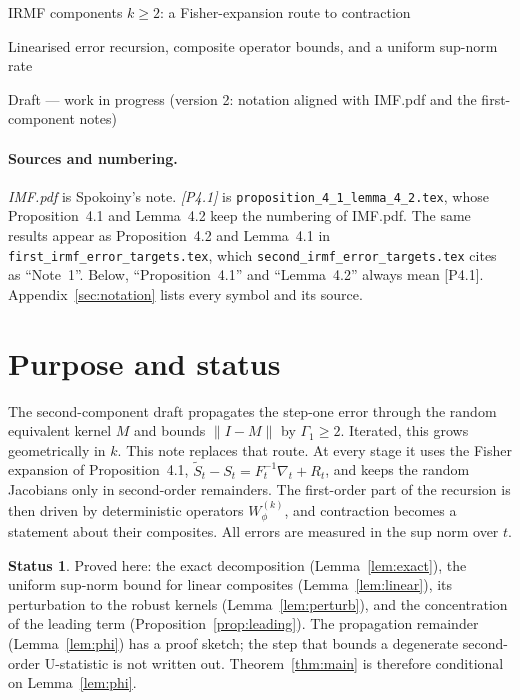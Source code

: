 \documentclass[11pt]{article}
\newcommand{\norm}[1]{\lVert#1\rVert}
\newcommand{\IMFt}{\widetilde S}
\theoremstyle{definition}
\newtheorem*{status}{Status}
\begin{document}
\sloppy
\begin{center}
  {\Large IRMF components \(k\ge2\): a Fisher-expansion route to contraction\par}
  \vspace{4pt}
  {\large Linearised error recursion, composite operator bounds, and a
   uniform sup-norm rate\par}
  \vspace{4pt}
  {\normalsize Draft --- work in progress (version 2: notation aligned with
  IMF.pdf and the first-component notes)}
\end{center}

\paragraph{Sources and numbering.}
\emph{IMF.pdf} is Spokoiny's note.  \emph{[P4.1]} is
\texttt{proposition\_4\_1\_lemma\_4\_2.tex}, whose Proposition~4.1 and
Lemma~4.2 keep the numbering of IMF.pdf.  The same results appear as
Proposition~4.2 and Lemma~4.1 in \texttt{first\_irmf\_error\_targets.tex},
which \texttt{second\_irmf\_error\_targets.tex} cites as ``Note~1''.  Below,
``Proposition~4.1'' and ``Lemma~4.2'' always mean [P4.1].
Appendix~\ref{sec:notation} lists every symbol and its source.

\section{Purpose and status}

The second-component draft propagates the step-one error through the random
equivalent kernel \(M\) and bounds \(\norm{I-M}\) by \(\Gamma_1\ge2\).
Iterated, this grows geometrically in \(k\).  This note replaces that route.
At every stage it uses the Fisher expansion of Proposition~4.1,
\(\IMFt_t-S_t=F_t^{-1}\nabla_t+R_t\), and keeps the random Jacobians only in
second-order remainders.  The first-order part of the recursion is then
driven by deterministic operators \(W^{(k)}_\phi\), and contraction becomes a
statement about their composites.  All errors are measured in the sup norm
over \(t\).

\begin{status}
Proved here: the exact decomposition (Lemma~\ref{lem:exact}), the uniform
sup-norm bound for linear composites (Lemma~\ref{lem:linear}), its
perturbation to the robust kernels (Lemma~\ref{lem:perturb}), and the
concentration of the leading term (Proposition~\ref{prop:leading}).  The
propagation remainder (Lemma~\ref{lem:phi}) has a proof sketch; the step that
bounds a degenerate second-order U-statistic is not written out.
Theorem~\ref{thm:main} is therefore conditional on Lemma~\ref{lem:phi}.
\end{status}
\end{document}
